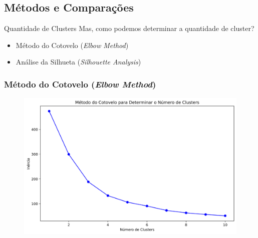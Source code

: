 \documentclass{beamer}
\begin{document}
\subsection{Métodos e Comparações}
\begin{frame}{Quantidade de Clusters}
   \centering \large{Mas, como podemos determinar a quantidade de cluster?}
   \pause
   \vspace{1cm}
   \begin{itemize}
       \item Método do Cotovelo (\textit{Elbow Method})
       \item Análise da Silhueta  (\textit{Silhouette Analysis})
   \end{itemize}
\end{frame}
\begin{frame}
    \frametitle{Método do Cotovelo (\textit{Elbow Method})}
\begin{figure}
    \centering
    \includegraphics[width=0.85\linewidth]{imagens/metodo_cotovelo.png}
        \label{fig:metododocotovelo}
\end{figure}
\end{frame}
\end{document}

